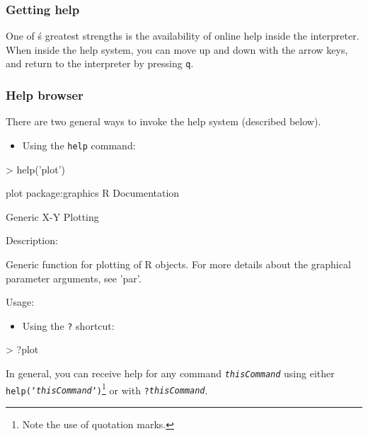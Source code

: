 \documentclass[10pt,letterpaper]{article}
\begin{document}
\subsubsection{Getting help}

One of \R \'s greatest strengths is the availability of online help inside the interpreter.  When inside the \R help system, you can move up and down with the arrow keys, and return to the interpreter by pressing \texttt{q}.

\subsubsection{Help browser} %

There are two general ways to invoke the \R help system (described below).

\begin{itemize}
  \item Using the \texttt{help} command:
\end{itemize}

\begin{Schunk}
\begin{Sinput}
> help('plot')
\end{Sinput}
\end{Schunk}
\begin{Schunk}
\begin{Soutput}
plot                package:graphics                R Documentation

Generic X-Y Plotting

Description:

     Generic function for plotting of R objects.  For more details
     about the graphical parameter arguments, see 'par'.

Usage:
\end{Soutput}
\end{Schunk}

\begin{itemize}
  \item Using the \texttt{?} shortcut:
\end{itemize}

\begin{Schunk}
\begin{Sinput}
> ?plot
\end{Sinput}
\end{Schunk}
%
In general, you can receive help for any command \emph{\texttt{thisCommand}} using either \texttt{help('\emph{thisCommand}')}\footnote{Note the use of quotation marks.} or with \texttt{?\emph{thisCommand}}.
\end{document}
